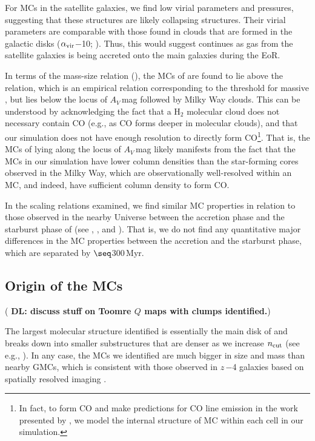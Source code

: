 \IfFileExists{emulateapjlegacy.cls}{\documentclass[iop]{emulateapjlegacy}}{\documentclass[iop]{emulateapj}}
\newcommand{\DL}[1]{({\bf \color{dlcolor} DL: #1})}
\begin{document}
For MCs in the satellite galaxies, we find low virial parameters and pressures, suggesting 
that these structures are likely collapsing structures. 
Their virial parameters are comparable with those found in clouds that are formed in the galactic disks 
($\alpha_{\rm vir}$$-$10; \citealt{Dobbs08a, Tasker09a}).
Thus, this would suggest 
\SF continues as gas from the satellite galaxies is being accreted onto the main galaxies during the EoR.

In terms of the mass-size relation (), the MCs of \flower are found to lie above the \citet{Kauffmann10c} relation, 
which is an empirical relation corresponding to the threshold for massive \SF, but lies
below the locus of $A_V$\,mag followed by Milky Way clouds.
This can be understood by acknowledging the fact that a H$_2$ molecular cloud
does not necessary contain CO (e.g., as CO forms deeper in molecular clouds),
and that our simulation does not have enough resolution to directly form CO\footnote{
In fact, to form CO and make predictions for CO line emission in the work presented by \citet{Vallini18a}, we
model the internal structure of MC within each cell in our simulation.}.
That is, the MCs of \flower lying along the locus of $A_V$\,mag likely manifests from the
fact that the MCs in our simulation have lower column densities than the star-forming cores observed in the Milky Way, which are
observationally well-resolved within an MC, and indeed, have sufficient column density to form CO.


In the scaling relations examined, we find similar MC properties 
in relation to those observed in the nearby Universe between the accretion phase and the starburst phase of
\flower (see , , and ).
That is, we do not find any quantitative major differences in the MC properties between the accretion and the starburst phase, which
are separated by $\seq$300\,Myr.

 
\subsection{Origin of the MCs} \label{sec:origin} 
\DL{discuss stuff on Toomre $Q$ maps with clumps identified.}

The largest molecular structure identified is essentially the main disk of \flower and breaks down into smaller
substructures that are denser as we increase $n_{\rm cut}$ (see e.g., ). In any case,
the MCs we identified are much bigger in size and mass than nearby GMCs, which is consistent with
those observed in $z$\,$-$4 galaxies based on spatially resolved imaging \citep{Swinbank11a}.
\end{document}

